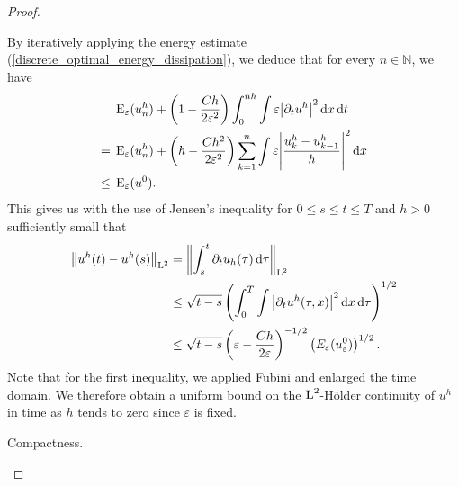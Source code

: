 \begin{proof}
\begin{description}[wide=0pt]
		By iteratively applying the energy estimate 
		(\ref{discrete_optimal_energy_dissipation}), we 
		deduce that for every $ n \in \mathbb{ N } $, we have
		\begin{align}
			& \operatorname{E}_{ \varepsilon } ( u_{ n }^{ h } )
			+
			\left(
			1
			-
			\frac{ C h  }{ 2 \varepsilon^{ 2 } }
			\right)
			\int_{ 0 }^{ n h }
			\int
			\varepsilon
			\abs{ \partial_{ t } u^{ h } }^{ 2 }
			\dd{ x }
			\dd{ t }
			\notag
			\\
			={} &
			\operatorname{E}_{ \varepsilon } ( u_{ n }^{ h } )
			+
			\left(
			h - \frac{ C h^{ 2 }}{ 2 \varepsilon^{ 2 } }
			\right)
			\sum_{k = 1 }^{ n }
			\int
			\varepsilon
			\abs{
				\frac{ u_{ k }^{ h } - u_{ k - 1 }^{ h } }{ h }
			}^{ 2 }
			\dd{ x }
			\notag
			\\
			\label{energy_and_time_derivative_bound}
			\leq {} &
			\operatorname{E}_{ \varepsilon } ( u^{ 0 } ).
		\end{align}
		This gives us with the use of Jensen's inequality for $ 0\leq s \leq t 
		\leq T $ and $ h > 0 $ sufficiently small that
		\begin{align}
			\norm{ u^{ h } ( t ) - u^{ h } ( s ) }_{ \operatorname{L}^{ 2 } }
			& =
			\norm{ 
				\int_{ s }^{ t }
				\partial_{ t } u_{ h } ( \tau )
				\dd{ \tau }
			}_{ \operatorname{L}^{ 2 } }
			\notag
			\\
			& \leq
			\sqrt{ t - s }
			\left(	
			\int_{ 0 }^{ T }
			\int
			\abs{ \partial_{ t } u^{ h } ( \tau, x ) }^{ 2 }
			\dd{ x }
			\dd{ \tau }
			\right)^{ 1/2 }
			\notag
			\\
			\label{hölder_continuity_of_uh}
			& \leq
			\sqrt{ t - s }
			\left(
			\varepsilon - \frac{ C h }{ 2 \varepsilon }
			\right)^{ - 1/2 }
			\left(  E_{ \varepsilon } ( u_{ \varepsilon }^{ 0 } ) \right)^{ 1/ 
			2 }.
		\end{align}
		Note that for the first inequality, we applied Fubini and enlarged the 
		time domain.
		We therefore obtain a uniform bound on the $ \operatorname{L}^{ 2 }$-Hölder 
		continuity of 
		$ u^{ h } $ in time as $ h $ tends to zero since $ \varepsilon $ is 
		fixed.
		
		\item[Step 5:] Compactness.
		

\end{description}
\end{proof}
